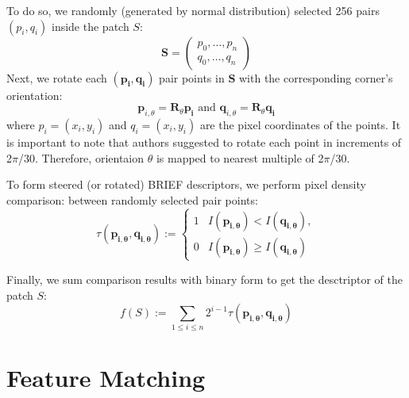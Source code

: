 \documentclass[a4paper]{report}
\numberwithin{figure}{section}
\begin{document}
\begin{enumerate}
    To do so, we randomly (generated by normal distribution) 
    selected 256 pairs $(p_i,q_i)$ 
    inside the patch $S$:
    \begin{equation}
      \mathbf{S} = 
      \begin{pmatrix}
      p_0, \dots, p_n\\
      q_0, \dots, q_n
      \end{pmatrix}
    \end{equation}
    Next, we rotate each $(\mathbf{p_i, q_i})$ pair points in 
    $\mathbf{S}$ with the 
    corresponding corner's orientation:
    \begin{equation}
      \mathbf{p}_{i,\theta} = \mathbf{R}_{\theta}\mathbf{p_i} \text{ and } 
      \mathbf{q}_{i,\theta} = \mathbf{R}_{\theta}\mathbf{q_i}
    \end{equation}
    where $p_i=(x_i, y_i)$ and $q_i=(x_i, y_i)$ are the pixel coordinates of 
    the points.
    It is important to note that authors \cite{} suggested to rotate each point in 
    increments of 2$\pi$/30. Therefore, orientaion $\theta$ is mapped to 
    nearest multiple of 2$\pi$/30.

    To form steered (or rotated) BRIEF descriptors, we perform pixel density comparison:
    between randomly selected pair points:
    \begin{equation*}
      \tau(\mathbf{p_{i,\theta}},\mathbf{q_{i,\theta}}) := 
      \begin{cases}
        1  & I(\mathbf{p_{i,\theta}}) < I(\mathbf{q_{i,\theta}}),\\
        0  & I(\mathbf{p_{i,\theta}}) \geq I(\mathbf{q_{i,\theta}})
      \end{cases}
    \end{equation*}

    Finally, we sum comparison results with binary form to get the desctriptor 
    of the patch $S$:
    \begin{equation}
      f(S) := \sum_{1\leq i \leq n} 2^{i-1}\tau (\mathbf{p_{i,\theta}, q_{i,\theta}})
    \end{equation}

\end{enumerate}





\section{Feature Matching} \label{sc_feature_matching}
\end{document}
